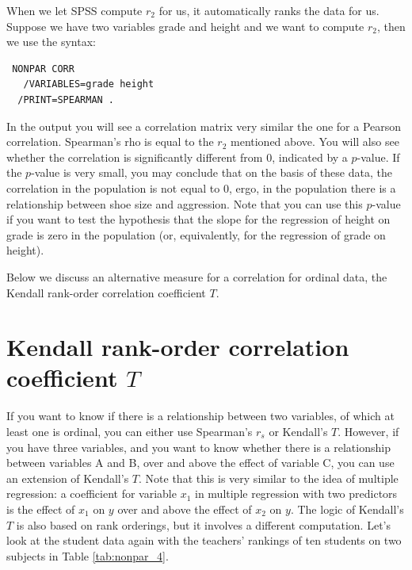 \documentclass[]{report}\usepackage[]{graphicx}\usepackage[]{color}
\begin{document}
When we let SPSS compute $r_2$ for us, it automatically ranks the data for us. Suppose we have two variables grade and height and we want to compute $r_2$, then we use the syntax:

 \begin{verbatim}
 NONPAR CORR 
   /VARIABLES=grade height 
  /PRINT=SPEARMAN .
 \end{verbatim}
  
In the output you will see a correlation matrix very similar the one for a Pearson correlation. Spearman's rho is equal to the $r_2$ mentioned above. You will also see whether the correlation is significantly different from 0, indicated by a $p$-value. If the $p$-value is very small, you may conclude that on the basis of these data, the correlation in the population is not equal to 0, ergo, in the population there is a relationship between shoe size and aggression. Note that you can use this $p$-value if you want to test the hypothesis that the slope for the regression of height on grade is zero in the population (or, equivalently, for the regression of grade on height).  
  

Below we discuss an alternative measure for a correlation for ordinal data, the Kendall rank-order correlation coefficient $T$. 


\section{Kendall rank-order correlation coefficient $T$}


If you want to know if there is a relationship between two variables, of which at least one is ordinal, you can either use Spearman's $r_s$ or Kendall's $T$. However, if you have three variables, and you want to know whether there is a relationship between variables A and B, over and above the effect of variable C, you can use an extension of Kendall's $T$. Note that this is very similar to the idea of multiple regression: a coefficient for variable $x_1$ in multiple regression with two predictors is the effect of $x_1$ on $y$ over and above the effect of $x_2$ on $y$. The logic of Kendall's $T$ is also based on rank orderings, but it involves a different computation. Let's look at the student data again with the teachers' rankings of ten students on two subjects in Table \ref{tab:nonpar_4}. 
\end{document}

